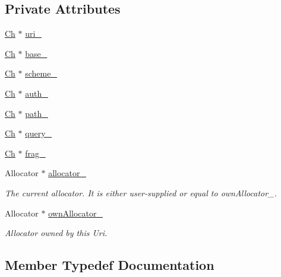 \subsection*{Private Attributes}
\begin{DoxyCompactItemize}
\item 
\hyperlink{classGenericUri_a20d0602cff62211d89bc4b25963beeee}{Ch} $\ast$ \hyperlink{classGenericUri_a41d10afd782236002b18b8cb681a2e3f}{uri\+\_\+}
\item 
\hyperlink{classGenericUri_a20d0602cff62211d89bc4b25963beeee}{Ch} $\ast$ \hyperlink{classGenericUri_a0f4b06d9f60105fe6f47f16b0a258bc2}{base\+\_\+}
\item 
\hyperlink{classGenericUri_a20d0602cff62211d89bc4b25963beeee}{Ch} $\ast$ \hyperlink{classGenericUri_a0a7f212c8f2c7a4d50bb855d6f85db7e}{scheme\+\_\+}
\item 
\hyperlink{classGenericUri_a20d0602cff62211d89bc4b25963beeee}{Ch} $\ast$ \hyperlink{classGenericUri_a639baa36906d6b2b8fe035e225fc2723}{auth\+\_\+}
\item 
\hyperlink{classGenericUri_a20d0602cff62211d89bc4b25963beeee}{Ch} $\ast$ \hyperlink{classGenericUri_a234d1bbd4ad0aa541ddb112324112c0c}{path\+\_\+}
\item 
\hyperlink{classGenericUri_a20d0602cff62211d89bc4b25963beeee}{Ch} $\ast$ \hyperlink{classGenericUri_a4e48c494a9ce691cf1e582110d591a5a}{query\+\_\+}
\item 
\hyperlink{classGenericUri_a20d0602cff62211d89bc4b25963beeee}{Ch} $\ast$ \hyperlink{classGenericUri_a0776231ad42838ccb66484fa12fa80ac}{frag\+\_\+}
\item 
Allocator $\ast$ \hyperlink{classGenericUri_a7dfc227fe6ffd380d4f9f69dc7ecc3b1}{allocator\+\_\+}
\begin{DoxyCompactList}\small\item\em The current allocator. It is either user-\/supplied or equal to own\+Allocator\+\_\+. \end{DoxyCompactList}\item 
Allocator $\ast$ \hyperlink{classGenericUri_af17ffab721cedc6db5ad2000bb13a06e}{own\+Allocator\+\_\+}
\begin{DoxyCompactList}\small\item\em Allocator owned by this Uri. \end{DoxyCompactList}\end{DoxyCompactItemize}


\subsection{Member Typedef Documentation}
\mbox{\label{classGenericUri_a20d0602cff62211d89bc4b25963beeee}} 
